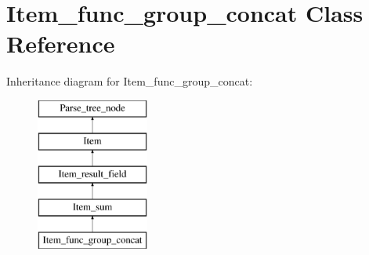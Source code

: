 \hypertarget{classItem__func__group__concat}{}\section{Item\+\_\+func\+\_\+group\+\_\+concat Class Reference}
\label{classItem__func__group__concat}
Inheritance diagram for Item\+\_\+func\+\_\+group\+\_\+concat\+:\begin{figure}[H]
\begin{center}
\leavevmode
\includegraphics[height=5.000000cm]{classItem__func__group__concat}
\end{center}
\end{figure}
